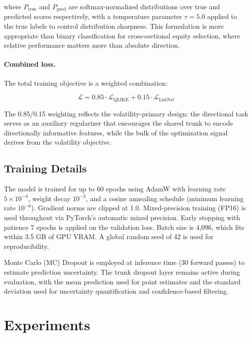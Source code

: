 \documentclass[12pt, a4paper]{article}
\begin{document}
where $P_{\text{true}}$ and $P_{\text{pred}}$ are softmax-normalized distributions over true and predicted scores respectively, with a temperature parameter $\tau = 5.0$ applied to the true labels to control distribution sharpness. This formulation is more appropriate than binary classification for cross-sectional equity selection, where relative performance matters more than absolute direction.

\paragraph{Combined loss.}
The total training objective is a weighted combination:

\begin{equation}
    \mathcal{L} = 0.85 \cdot \mathcal{L}_{\text{QLIKE}} + 0.15 \cdot \mathcal{L}_{\text{ListNet}}
\end{equation}

The 0.85/0.15 weighting reflects the volatility-primary design: the directional task serves as an auxiliary regularizer that encourages the shared trunk to encode directionally informative features, while the bulk of the optimization signal derives from the volatility objective.

\subsection{Training Details}

The model is trained for up to 60 epochs using AdamW \citep{loshchilov2019decoupled} with learning rate $5 \times 10^{-4}$, weight decay $10^{-3}$, and a cosine annealing schedule (minimum learning rate $10^{-6}$). Gradient norms are clipped at 1.0. Mixed-precision training (FP16) is used throughout via PyTorch's automatic mixed precision. Early stopping with patience 7 epochs is applied on the validation loss. Batch size is 4,096, which fits within 3.5 GB of GPU VRAM. A global random seed of 42 is used for reproducibility.

Monte Carlo (MC) Dropout is employed at inference time (30 forward passes) to estimate prediction uncertainty. The trunk dropout layer remains active during evaluation, with the mean prediction used for point estimates and the standard deviation used for uncertainty quantification and confidence-based filtering.


\section{Experiments}
\label{sec:experiments}
\end{document}
